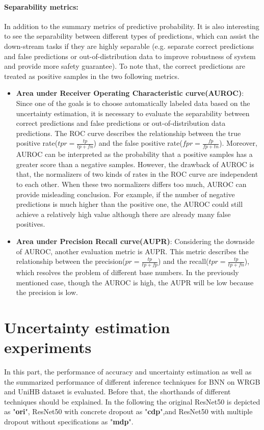 \paragraph{Separability metrics:} In addition to the summary metrics of predictive probability.
It is also interesting to see the separability between different types of predictions, which can assist the down-stream tasks if they are highly separable (e.g. separate correct predictions and false predictions or out-of-distribution data to improve robustness of system and provide more safety guarantee).
To note that, the correct predictions are treated as positive samples in the two following metrics.
\begin{itemize}
	\item \textbf{Area under Receiver Operating Characteristic curve(AUROC)}: Since one of the goals is to choose automatically labeled data based on the uncertainty estimation, it is necessary to evaluate the separability between correct predictions and false predictions or out-of-distribution data predictions.
	The ROC curve describes the relationship between the true positive rate($tpr=\frac{tp}{tp+fn}$) and the false positive rate($fpr=\frac{fp}{fp+tn}$).
	Moreover, AUROC can be interpreted as the probability that a positive samples has a greater score than a negative samples.
	However, the drawback of AUROC is that, the normalizers of two kinds of rates in the ROC curve are independent to each other.
	When these two normalizers differs too much, AUROC can provide misleading conclusion.
	For example, if the number of negative predictions is much higher than the positive one, the AUROC could still achieve a relatively high value although there are already many false positives. 
	
	\item \textbf{Area under Precision Recall curve(AUPR)}: Considering the downside of AUROC, another evaluation metric is AUPR.
	This metric describes the relationship between the precision($pr = \frac{tp}{tp+fp}$) and the recall($tpr=\frac{tp}{tp+fn}$), which resolves the problem of different base numbers.
	In the previously mentioned case, though the AUROC is high, the AUPR will be low because the precision is low. 
\end{itemize}


\section{Uncertainty estimation experiments}
In this part, the performance of accuracy and uncertainty estimation as well as the summarized performance of different inference techniques for BNN on WRGB and UniHB dataset is evaluated.
Before that, the shorthands of different techniques should be explained.
In the following the original ResNet50 is depicted as "\textbf{ori}", ResNet50 with concrete dropout as "\textbf{cdp}",and ResNet50 with multiple dropout without specifications as "\textbf{mdp}".

